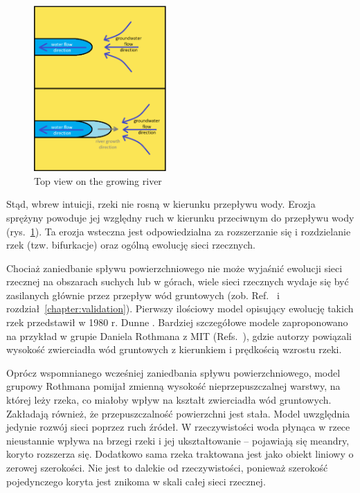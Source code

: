 \documentclass[]{pracamgr}
\begin{document}
    \begin{figure}
      \begin{center}
        \vspace{-20pt}
        \includegraphics[width=0.45\textwidth]{figs/zrodlo_eng.png}
      \end{center}
      \vspace{-20pt}
      \caption{Top view on the growing river}
      \vspace{0pt}
      \label{zrodlo}
    \end{figure}

    Stąd, wbrew intuicji, rzeki nie rosną w kierunku przepływu wody. Erozja sprężyny powoduje jej względny ruch w kierunku przeciwnym do przepływu wody (rys.~\ref{zrodlo}). Ta erozja wsteczna jest odpowiedzialna za rozszerzanie się i rozdzielanie rzek (tzw. bifurkacje) oraz ogólną ewolucję sieci rzecznych.

    Chociaż zaniedbanie spływu powierzchniowego nie może wyjaśnić ewolucji sieci rzecznej na obszarach suchych lub w górach, wiele sieci rzecznych wydaje się być zasilanych głównie przez przepływ wód gruntowych (zob. Ref.~\cite{schumm1995ground, petroff2011geometry, seybold2017climate} i rozdział~\ref{chapter:validation}). Pierwszy ilościowy model opisujący ewolucję takich rzek przedstawił w 1980 r. Dunne \cite{dunne1980formation}. Bardziej szczegółowe modele zaproponowano na przykład w grupie Daniela Rothmana z MIT (Refs.~\cite{petroff2012four, devauchelle2012ramification}), gdzie autorzy powiązali wysokość zwierciadła wód gruntowych z kierunkiem i prędkością wzrostu rzeki.

    Oprócz wspomnianego wcześniej zaniedbania spływu powierzchniowego, model grupowy Rothmana pomijał zmienną wysokość nieprzepuszczalnej warstwy, na której leży rzeka, co miałoby wpływ na kształt zwierciadła wód gruntowych. Zakładają również, że przepuszczalność powierzchni jest stała. Model uwzględnia jedynie rozwój sieci poprzez ruch źródeł. W rzeczywistości woda płynąca w rzece nieustannie wpływa na brzegi rzeki i jej ukształtowanie – pojawiają się meandry, koryto rozszerza się. Dodatkowo sama rzeka traktowana jest jako obiekt liniowy o zerowej szerokości. Nie jest to dalekie od rzeczywistości, ponieważ szerokość pojedynczego koryta jest znikoma w skali całej sieci rzecznej.
\end{document}
